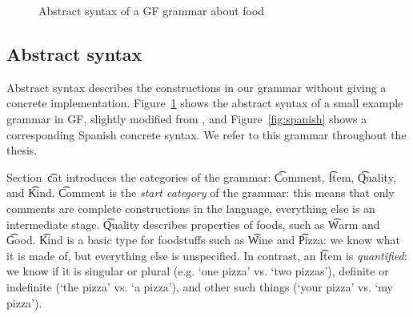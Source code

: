 \begin{figure}[h]
\centering

\begin{Shaded}
\begin{Highlighting}[]
 \FunctionTok{=} \NormalTok{\{}
  \FunctionTok{=}  \NormalTok{;}
     \NormalTok{; } \NormalTok{; } \NormalTok{; } \NormalTok{;}
    \OtherTok{ :}  \OtherTok{->}  \OtherTok{->}  \NormalTok{;                 }
    \NormalTok{, }\NormalTok{, }\NormalTok{, }\OtherTok{ :}  \OtherTok{->}  \NormalTok{;           }
    \OtherTok{ :}  \OtherTok{->}  \OtherTok{->}  \NormalTok{;                     }
    \NormalTok{, }\NormalTok{, }\NormalTok{, }\OtherTok{ :}  \NormalTok{;}
    \NormalTok{, }\NormalTok{, }\NormalTok{, }\OtherTok{ :}  \NormalTok{;}
\end{Highlighting}
\end{Shaded}
  \caption{Abstract syntax of a GF grammar about food}
\label{fig:foods}
\end{figure}

\subsection{Abstract syntax}


Abstract syntax describes the constructions in our grammar without
giving a concrete implementation. Figure~\ref{fig:foods}
shows the abstract syntax of a small example grammar in GF, slightly
modified from \cite{ranta2011gfbook}, and Figure~\ref{fig:spanish}
shows a corresponding Spanish concrete syntax. We refer to this
grammar throughout the thesis. 

Section~\t{cat} introduces the categories of the grammar: \t{Comment},
\t{Item},  \t{Quality}, and \t{Kind}.  \t{Comment} is the \emph{start
  category} of the grammar: this means that only comments are complete
constructions in the language, everything else is an intermediate
stage. \t{Quality} describes properties of foods, such as
\t{Warm} and \t{Good}. %
\t{Kind} is a basic type for foodstuffs such as \t{Wine} and
\t{Pizza}: we know what it is made of, but everything else is
unspecified. In contrast, an \t{Item} is \emph{quantified}: we know if
it is singular or plural (e.g. `one pizza' vs. `two pizzas'), definite or
indefinite (`the pizza' vs. `a pizza'), and other such things (`your
pizza' vs. `my pizza'). 


